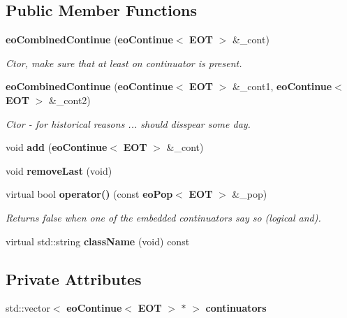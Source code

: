 \subsection*{Public Member Functions}
\begin{CompactItemize}
\item 
{\bf eo\-Combined\-Continue} ({\bf eo\-Continue}$<$ {\bf EOT} $>$ \&\_\-cont)\label{classeo_combined_continue_a0}

\begin{CompactList}\small\item\em Ctor, make sure that at least on continuator is present. \item\end{CompactList}\item 
{\bf eo\-Combined\-Continue} ({\bf eo\-Continue}$<$ {\bf EOT} $>$ \&\_\-cont1, {\bf eo\-Continue}$<$ {\bf EOT} $>$ \&\_\-cont2)\label{classeo_combined_continue_a1}

\begin{CompactList}\small\item\em Ctor - for historical reasons ... should disspear some day. \item\end{CompactList}\item 
void {\bf add} ({\bf eo\-Continue}$<$ {\bf EOT} $>$ \&\_\-cont)\label{classeo_combined_continue_a2}

\item 
void {\bf remove\-Last} (void)\label{classeo_combined_continue_a3}

\item 
virtual bool {\bf operator()} (const {\bf eo\-Pop}$<$ {\bf EOT} $>$ \&\_\-pop)\label{classeo_combined_continue_a4}

\begin{CompactList}\small\item\em Returns false when one of the embedded continuators say so (logical and). \item\end{CompactList}\item 
virtual std::string {\bf class\-Name} (void) const \label{classeo_combined_continue_a5}

\end{CompactItemize}
\subsection*{Private Attributes}
\begin{CompactItemize}
\item 
std::vector$<$ {\bf eo\-Continue}$<$ {\bf EOT} $>$ $\ast$ $>$ {\bf continuators}\label{classeo_combined_continue_r0}

\end{CompactItemize}


